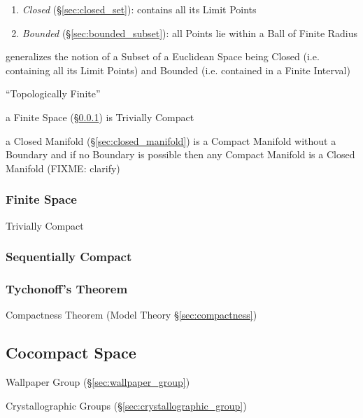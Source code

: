 \begin{enumerate}
\item \emph{Closed} (\S\ref{sec:closed_set}): contains all its Limit Points
\item \emph{Bounded} (\S\ref{sec:bounded_subset}): all Points lie within a Ball
  of Finite Radius
\end{enumerate}

generalizes the notion of a Subset of a Euclidean Space being Closed
(i.e. containing all its Limit Points) and Bounded (i.e. contained in
a Finite Interval)

``Topologically Finite''

a Finite Space (\S\ref{sec:finite_space}) is Trivially Compact

\fist a Closed Manifold (\S\ref{sec:closed_manifold}) is a Compact Manifold
without a Boundary and if no Boundary is possible then any Compact Manifold
is a Closed Manifold (FIXME: clarify)



\subsubsection{Finite Space}\label{sec:finite_space}

Trivially Compact



\subsubsection{Sequentially Compact}\label{sec:sequentially_compact}

\subsubsection{Tychonoff's Theorem}\label{sec:tychonoffs_theorem}

Compactness Theorem (Model Theory \S\ref{sec:compactness})



\subsection{Cocompact Space}\label{sec:cocompact_space}

Wallpaper Group (\S\ref{sec:wallpaper_group})

Crystallographic Groups (\S\ref{sec:crystallographic_group})



